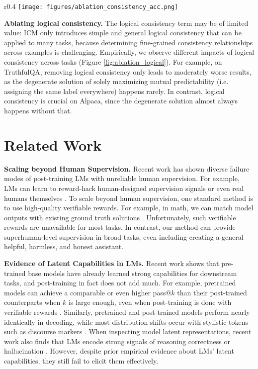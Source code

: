 \documentclass{article}
\newcommand{\ourmethod}[0]{\textsc{ICM}\xspace}
\begin{document}
\begin{wrapfigure}{r}{0.4\linewidth}
    \centering
    \vspace{-4mm}
    \texttt{[image: figures/ablation\_consistency\_acc.png]}
    \caption{Impact of logical consistency.}
    \vspace{-4mm}
    \label{fig:ablation_logical}
\end{wrapfigure}
\textbf{Ablating logical consistency.} The logical consistency term may be of limited value: \ourmethod only introduces simple and general logical consistency that can be applied to many tasks, because determining fine-grained consistency relationships across examples is challenging. Empirically, we observe different impacts of logical consistency across tasks (Figure \ref{fig:ablation_logical}). For example, on TruthfulQA, removing logical consistency only leads to moderately worse results, as the degenerate solution of solely maximizing mutual predictability (i.e. assigning the same label everywhere) happens rarely. In contrast, logical consistency is crucial on Alpaca, since the degenerate solution almost always happens without that.

\section{Related Work}



\textbf{Scaling beyond Human Supervision.} Recent work has shown diverse failure modes of post-training LMs with unreliable human supervision. For example, LMs can learn to reward-hack human-designed supervision signals \citep{baker2025monitoring} or even real humans themselves \citep{wen2024language}. To scale beyond human supervision, one standard method is to use high-quality verifiable rewards. For example, in math, we can match model outputs with existing ground truth solutions \citep{guo2025deepseek}. Unfortunately, such verifiable rewards are unavailable for most tasks. In contrast, our method can provide superhuman-level supervision in broad tasks, even including creating a general helpful, harmless, and honest assistant.

\textbf{Evidence of Latent Capabilities in LMs.} Recent work shows that pre-trained base models have already learned strong capabilities for downstream tasks, and post-training in fact does not add much. For example, pretrained models can achieve a comparable or even higher pass@$k$ than their post-trained counterparts when $k$ is large enough, even when post-training is done with verifiable rewards  \citep{yue2025does}. Similarly, pretrained and post-trained models perform nearly identically in decoding, while most distribution shifts occur with stylistic tokens such as discourse markers \citep{lin2023unlocking}. When inspecting model latent representations, recent work also finds that LMs encode strong signals of reasoning correctness \citep{zhang2025reasoning} or hallucination \citep{kadavath2022language, ferrando2024know}. However, despite prior empirical evidence about LMs' latent capabilities, they still fail to elicit them effectively.
\end{document}
